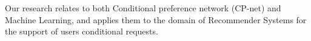 \label{sec_Relwork}
%

Our research relates to both Conditional preference network (CP-net) and Machine Learning, and applies them to the domain of Recommender Systems for the support of users conditional requests.
%
